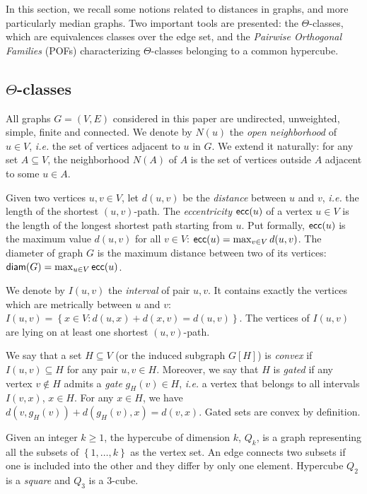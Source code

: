 \documentclass[a4paper,UKenglish,numberwithinsect,cleveref, autoref]{lipics-v2021}
\newcommand{\set}[1]{\left\{ #1 \right\}}
\newcommand{\diam}{\mbox{\textsf{diam}}}
\newcommand{\ecc}{\mbox{\textsf{ecc}}}
\begin{document}
In this section, we recall some notions related to distances in graphs, and more particularly median graphs. Two important tools are presented: the $\Theta$-classes, which are equivalences classes over the edge set, and the \textit{Pairwise Orthogonal Families} (POFs) characterizing $\Theta$-classes belonging to a common hypercube. 

\subsection{$\Theta$-classes} 

All graphs $G = (V,E)$ considered in this paper are undirected, unweighted, simple, finite and connected. We denote by $N(u)$ the \textit{open neighborhood} of $u \in V$, {\em i.e.} the set of vertices adjacent to $u$ in $G$. We extend it naturally: for any set $A \subseteq V$, the neighborhood $N(A)$ of $A$ is the set of vertices outside $A$ adjacent to some $u \in A$.

Given two vertices $u,v \in V$, let $d(u,v)$ be the \textit{distance} between $u$ and $v$, {\em i.e.} the length of the shortest $(u,v)$-path. The \textit{eccentricity} $\ecc(u)$ of a vertex $u \in V$ is the length of the longest shortest path starting from $u$. Put formally, $\ecc(u)$ is the maximum value $d(u,v)$ for all $v \in V$: $\ecc(u) = \max_{v \in V} d(u,v)$. The diameter of graph $G$ is the maximum distance between two of its vertices: $\diam(G) = \max_{u \in V} \ecc(u)$. 

We denote by $I(u,v)$ the \textit{interval} of pair $u,v$. It contains exactly the vertices which are metrically between $u$ and $v$:
$I(u,v) = \set{x \in V: d(u,x) + d(x,v) = d(u,v)}$. The vertices of $I(u,v)$ are lying on at least one shortest $(u,v)$-path.

We say that a set $H\subseteq V$ (or the induced subgraph $G\left[H\right]$) is \textit{convex} if $I(u,v) \subseteq H$ for any pair $u,v \in H$. Moreover, we say that $H$ is \textit{gated} if any vertex $v \notin H$ admits a \textit{gate} $g_H(v) \in H$, {\em i.e.} a vertex that belongs to all intervals $I(v,x)$, $x\in H$. For any $x \in H$, we have $d(v,g_H(v)) + d(g_H(v),x) = d(v,x)$. Gated sets are convex by definition.

Given an integer $k \ge 1$, the hypercube of dimension $k$, $Q_k$, is a graph representing all the subsets of $\set{1,\ldots,k}$ as the vertex set. An edge connects two subsets if one is included into the other and they differ by only one element. Hypercube $Q_2$ is a \textit{square} and $Q_3$ is a $3$-cube.
\end{document}
